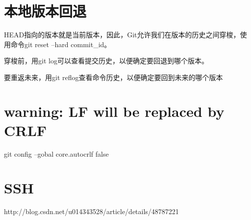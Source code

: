 \chapter{本地版本回退}
HEAD指向的版本就是当前版本，因此，Git允许我们在版本的历史之间穿梭，使用命令git reset --hard commit_id。

穿梭前，用git log可以查看提交历史，以便确定要回退到哪个版本。

要重返未来，用git reflog查看命令历史，以便确定要回到未来的哪个版本
\chapter{warning: LF will be replaced by CRLF}

git config --gobal core.autocrlf false 
\chapter{SSH}
http://blog.csdn.net/u014343528/article/details/48787221